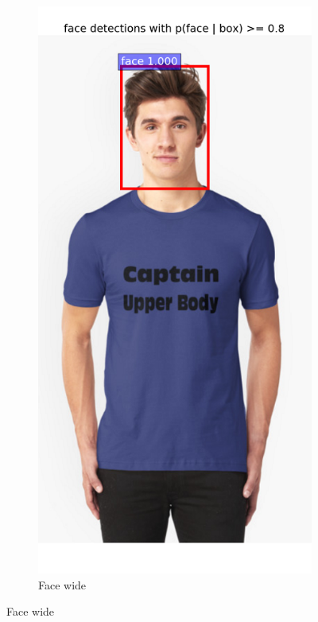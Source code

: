 \documentclass[conference]{IEEEtran}
\begin{document}
\begin{figure}
	~
	\begin{subfigure}[b]{0.18\textwidth}
		\includegraphics[width=\textwidth]{face_wide}
		\caption{Face wide}
		\label{fig:fw}

\end{subfigure}
\end{figure}
\end{document}
